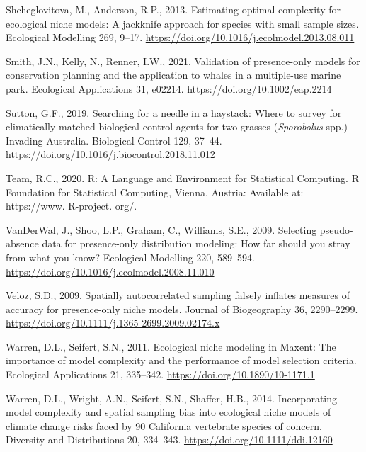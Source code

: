 \documentclass[12pt,]{article}
\begin{document}
\begin{CSLReferences}{1}{0}
\leavevmode\hypertarget{ref-Shcheglovitova2013}{}%
Shcheglovitova, M., Anderson, R.P., 2013. Estimating optimal complexity
for ecological niche models: {A} jackknife approach for species with
small sample sizes. Ecological Modelling 269, 9--17.
\url{https://doi.org/10.1016/j.ecolmodel.2013.08.011}

\leavevmode\hypertarget{ref-Smith2021}{}%
Smith, J.N., Kelly, N., Renner, I.W., 2021. Validation of presence-only
models for conservation planning and the application to whales in a
multiple-use marine park. Ecological Applications 31, e02214.
\url{https://doi.org/10.1002/eap.2214}

\leavevmode\hypertarget{ref-Sutton2019b}{}%
Sutton, G.F., 2019. Searching for a needle in a haystack: {Where} to
survey for climatically-matched biological control agents for two
grasses ({\emph{Sporobolus}} spp.) Invading {Australia}. Biological
Control 129, 37--44.
\url{https://doi.org/10.1016/j.biocontrol.2018.11.012}

\leavevmode\hypertarget{ref-RCoreTeam2020}{}%
Team, R.C., 2020. R: A Language and Environment for Statistical
Computing. R Foundation for Statistical Computing, Vienna, Austria:
Available at: https://www. R-project. org/.

\leavevmode\hypertarget{ref-VanDerWal2009}{}%
VanDerWal, J., Shoo, L.P., Graham, C., Williams, S.E., 2009. Selecting
pseudo-absence data for presence-only distribution modeling: {How} far
should you stray from what you know? Ecological Modelling 220, 589--594.
\url{https://doi.org/10.1016/j.ecolmodel.2008.11.010}

\leavevmode\hypertarget{ref-Veloz2009}{}%
Veloz, S.D., 2009. Spatially autocorrelated sampling falsely inflates
measures of accuracy for presence-only niche models. Journal of
Biogeography 36, 2290--2299.
\url{https://doi.org/10.1111/j.1365-2699.2009.02174.x}

\leavevmode\hypertarget{ref-Warren2011}{}%
Warren, D.L., Seifert, S.N., 2011. Ecological niche modeling in
{Maxent}: The importance of model complexity and the performance of
model selection criteria. Ecological Applications 21, 335--342.
\url{https://doi.org/10.1890/10-1171.1}

\leavevmode\hypertarget{ref-Warren2014}{}%
Warren, D.L., Wright, A.N., Seifert, S.N., Shaffer, H.B., 2014.
Incorporating model complexity and spatial sampling bias into ecological
niche models of climate change risks faced by 90 {California} vertebrate
species of concern. Diversity and Distributions 20, 334--343.
\url{https://doi.org/10.1111/ddi.12160}


\end{CSLReferences}
\end{document}
